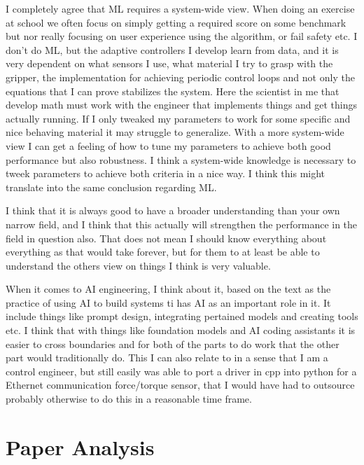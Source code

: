 \documentclass[11pt]{article}
\begin{document}
I completely agree that ML requires a system-wide view. When doing an exercise at school we often focus on simply getting a required score on some benchmark but nor really focusing on user experience using the algorithm, or fail safety etc. I don't do ML, but the adaptive controllers I develop learn from data, and it is very dependent on what sensors I use, what material I try to grasp with the gripper, the implementation for achieving periodic control loops and not only the equations that I can prove stabilizes the system. Here the scientist in me that develop math must work with the engineer that implements things and get things actually running. If I only tweaked my parameters to work for some specific and nice behaving material it may struggle to generalize. With a more system-wide view I can get a feeling of how to tune my parameters to achieve both good performance but also robustness. I think a system-wide knowledge is necessary to tweek parameters to achieve both criteria in a nice way. I think this might translate into the same conclusion regarding ML.

I think that it is always good to have a broader understanding than your own narrow field, and I think that this actually will strengthen the performance in the field in question also. That does not mean I should know everything about everything as that would take forever, but for them to at least be able to understand the others view on things I think is very valuable.

When it comes to AI engineering, I think about it, based on the text as the practice of using AI to build systems ti has AI as an important role in it. It include things like prompt design, integrating pertained models and creating tools etc. I think that with things like foundation models and AI coding assistants it is easier to cross boundaries and for both of the parts to do work that the other part would traditionally do. This I can also relate to in a sense that I am a control engineer, but still easily was able to port a driver in cpp into python for a Ethernet communication force/torque sensor, that I would have had to outsource probably otherwise to do this in a reasonable time frame. 

\section{Paper Analysis}
\end{document}
